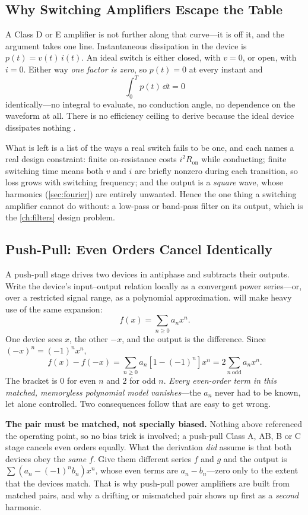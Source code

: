\subsection{Why Switching Amplifiers Escape the Table}
\label{sec:switching}
A Class D or E amplifier is not further along that curve---it is off it, and the
argument takes one line. Instantaneous dissipation in the device is
\(p(t)=v(t)\,i(t)\). An ideal switch is either closed, with \(v=0\), or open, with
\(i=0\). Either way \emph{one factor is zero}, so \(p(t)=0\) at every instant and
\[
\int_0^T p(t)\,\dd t=0
\]
identically---no integral to evaluate, no conduction angle, no dependence on the
waveform at all. There is no efficiency ceiling to derive because the ideal device
dissipates nothing \cite[pp.~223--240]{davis2011rfcircuit}.

What is left is a list of the ways a real switch fails to be one, and each names a
real design constraint: finite on-resistance costs \(i^2R_{\mathrm{on}}\) while
conducting; finite switching time means both \(v\) and \(i\) are briefly nonzero
during each transition, so loss grows with switching frequency; and the output is a
\emph{square} wave, whose harmonics (\cref{sec:fourier}) are entirely
unwanted. Hence the one thing a switching amplifier cannot do without: a low-pass or
band-pass filter on its output, which is the \cref{ch:filters} design problem.

\subsection{Push-Pull: Even Orders Cancel Identically}
\label{sec:pushpull}
A push-pull stage drives two devices in antiphase and subtracts their outputs. Write
the device's input--output relation locally as a convergent power series---or, over
a restricted signal range, as a polynomial approximation. 
will make heavy use of the same expansion:
\[
f(x)=\sum_{n\ge0}a_nx^n .
\]
One device sees \(x\), the other \(-x\), and the output is the difference. Since
\((-x)^n=(-1)^nx^n\),
\[
f(x)-f(-x)=\sum_{n\ge0}a_n\left[1-(-1)^n\right]x^n
=2\!\!\sum_{n\ \mathrm{odd}}\!\!a_nx^n .
\]
The bracket is \(0\) for even \(n\) and \(2\) for odd \(n\). \emph{Every even-order
term in this matched, memoryless polynomial model vanishes}---the \(a_n\) never had
to be known, let alone controlled. Two consequences follow that are easy to get
wrong.

\textbf{The pair must be matched, not specially biased.} Nothing above referenced the
operating point, so no bias trick is involved; a push-pull Class A, AB, B or C stage
cancels even orders equally. What the derivation \emph{did} assume is that both
devices obey the \emph{same} \(f\). Give them different series \(f\) and \(g\) and the
output is \(\sum(a_n-(-1)^nb_n)x^n\), whose even terms are \(a_n-b_n\)---zero only to
the extent that the devices match. That is why push-pull power amplifiers are built
from matched pairs, and why a drifting or mismatched pair shows up first as a
\emph{second} harmonic.

